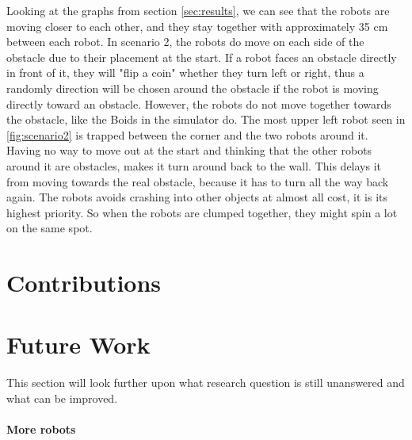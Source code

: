 Looking at the graphs from section \ref{sec:results}, we can see that the robots are moving closer to each other, and they stay together with approximately 35 cm between each robot. In scenario 2, the robots do move on each side of the obstacle due to their placement at the start. If a robot faces an obstacle directly in front of it, they will "flip a coin" whether they turn left or right, thus a randomly direction will be chosen around the obstacle if the robot is moving directly toward an obstacle.
However, the robots do not move together towards the obstacle, like the Boids in the simulator do. The most upper left robot seen in \ref{fig:scenario2} is trapped between the corner and the two robots around it. Having no way to move out at the start and thinking that the other robots around it are obstacles, makes it turn around back to the wall. This delays it from moving towards the real obstacle, because it has to turn all the way back again.
The robots avoids crashing into other objects at almost all cost, it is its highest priority. So when the robots are clumped together, they might spin a lot on the same spot.






\section{Contributions}
\label{sec:Contributions}





\section{Future Work}
\label{sec:futureWork}

This section will look further upon what research question is still unanswered and what can be improved.\\\\
\textbf{More robots}

